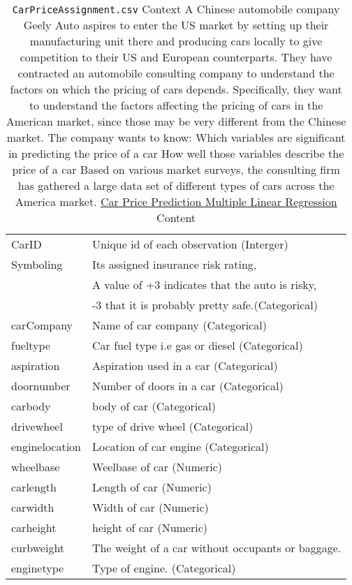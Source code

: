 \documentclass[12pt]{article}
\theoremstyle{remark}
\begin{document}
\begin{table}
	\caption{ \texttt{CarPriceAssignment.csv}
Context
A Chinese automobile company Geely Auto aspires to enter the US market by setting up their manufacturing unit there and producing cars locally to give competition to their US and European counterparts.
They have contracted an automobile consulting company to understand the factors on which the pricing of cars depends. Specifically, they want to understand the factors affecting the pricing of cars in the American market, since those may be very different from the Chinese market. The company wants to know:
Which variables are significant in predicting the price of a car
How well those variables describe the price of a car
Based on various market surveys, the consulting firm has gathered a large data set of different types of cars across the America market.
\href{https://www.kaggle.com/datasets/hellbuoy/car-price-prediction}{Car Price Prediction Multiple Linear Regression} Content
}
	\begin{tabular}{l|l}\hline
CarID		&	Unique id of each observation (Interger)		\\
Symboling 	&		Its assigned insurance risk rating,\\ &
 A value of +3 indicates that the auto is risky, \\& -3 that it is probably pretty safe.(Categorical) \\
carCompany	&		Name of car company (Categorical)	\\	
fueltype	&		Car fuel type i.e gas or diesel (Categorical)		\\
aspiration	&		Aspiration used in a car (Categorical)		\\
doornumber	&		Number of doors in a car (Categorical)		\\
carbody		&	body of car (Categorical)		\\
drivewheel	&		type of drive wheel (Categorical)		\\
enginelocation	&		Location of car engine (Categorical)		\\
wheelbase		&	Weelbase of car (Numeric)		\\
carlength	&		Length of car (Numeric)		\\
carwidth	&		Width of car (Numeric)		\\
carheight	&		height of car (Numeric)		\\
curbweight	&		The weight of a car without occupants or baggage.	\\
enginetype	&		Type of engine. (Categorical)		\\

\end{tabular}
\end{table}
\end{document}
